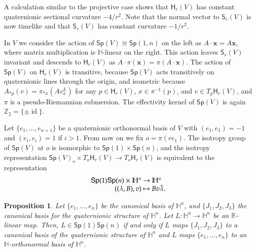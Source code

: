 \documentclass[12pt, a4paper]{amsart}
\newcommand{\id}{\operatorname{id}}
\newcommand{\R}{\mathbb{R}}
\renewcommand{\H}{\mathbb{H}}
\newcommand{\Sp}{\mathsf{Sp}}
\newtheorem{proposition}[theorem]{Proposition}
\theoremstyle{remark}
\begin{document}
A calculation similar to the projective case shows that $\mathsf{H}_r(V)$ has constant quaternionic sectional curvature $-4/r^2$. 
Note that the normal vector to $\mathsf{S}_r(V)$ is now timelike and that $\mathsf{S}_r(V)$ has constant curvature $-1/r^2$.
\medskip

In $V$ we consider the action of $\Sp(V)\cong\Sp(1,n)$ on the left as
$A\cdot\mathbf{x}=A\mathbf{x}$, where matrix multiplication is $\H$-linear on the right.
This action leaves $\mathsf{S}_r(V)$ invariant and descends to $\mathsf{H}_r(V)$ as $A\cdot\pi(\mathbf{x})=\pi(A\cdot\mathbf{x})$.
The action of $\Sp(V)$ on $\mathsf{H}_r(V)$ is transitive, because $\Sp(V)$ acts transitively on quaternionic lines through the origin, and isometric because
$A_{*p}(v)=\pi_{*x}(Av_x^L)$ for any $p\in\mathsf{H}_r(V)$, $x\in\pi^{-1}(p)$, and $v\in T_p\mathsf{H}_r(V)$, and $\pi$ is a pseudo-Riemannian submersion.
The effectivity kernel of $\Sp(V)$ is again $\mathbb{Z}_2=\{\pm \id\}$.

Let $\{e_1,\dots,e_{n+1}\}$ be a quaternionic orthonormal basis of $V$ with $(e_1,e_1)=-1$ and $(e_i,e_i)=1$ if $i>1$.
From now on we fix $o=\pi(re_1)$.
The isotropy group of $\Sp(V)$ at $o$ is isomorphic to $\Sp(1)\times\Sp(n)$, 
and the isotropy representation $\Sp(V)_o\times T_o\mathsf{H}_r(V)\to T_o\mathsf{H}_r(V)$
is equivalent to the representation
\[
\begin{array}{r@{\ }c@{\ }l}
\Sp(1)\Sp(n)\times\H^n & \to & \H^n\\
((\lambda,B),v) & \mapsto & Bv\bar{\lambda}.
\end{array}
\]

\begin{proposition}
Let $\{e_1,\dots,e_n\}$ be the canonical basis of $\H^n$, and $\{J_1,J_2,J_3\}$ the canonical basis for the quaternionic structure of $\H^n$.
Let $L\colon\H^n\to\H^n$ be an $\R$-linear map.
Then, $L\in\Sp(1)\Sp(n)$ if and only if $L$ maps $\{J_1,J_2,J_3\}$ to a canonical basis of the quaternionic structure of $\H^n$ and $L$ maps $\{e_1,\dots,e_n\}$ to an $\H$-orthonormal basis of $\H^n$.
\end{proposition}
\end{document}
